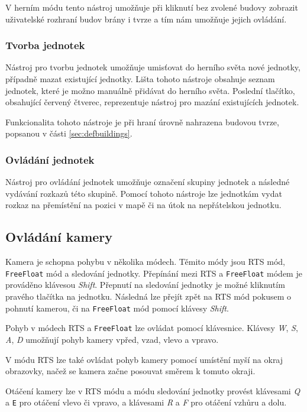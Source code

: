 V herním módu tento nástroj umožňuje při kliknutí bez zvolené budovy zobrazit uživatelské rozhraní budov brány i tvrze a tím nám umožňuje jejich ovládání.

\subsubsection{Tvorba jednotek}
Nástroj pro tvorbu jednotek umožňuje umisťovat do herního světa nové jednotky, případně mazat existující jednotky. Lišta tohoto nástroje obsahuje seznam jednotek, které je možno manuálně přidávat do herního světa. Poslední tlačítko, obsahující červený čtverec, reprezentuje nástroj pro mazání existujících jednotek.

Funkcionalita tohoto nástroje je při hraní úrovně nahrazena budovou tvrze, popsanou v části \ref{sec:defbuildings}.

\subsubsection{Ovládání jednotek}
Nástroj pro ovládání jednotek umožňuje označení skupiny jednotek a následné vydávání rozkazů této skupině. Pomocí tohoto nástroje lze jednotkám vydat rozkaz na přemístění na pozici v mapě či na útok na nepřátelskou jednotku.


\subsection{Ovládání kamery}
Kamera je schopna pohybu v několika módech. Těmito módy jsou RTS mód, \texttt{FreeFloat} mód a sledování jednotky. Přepínání mezi RTS a \texttt{FreeFloat} módem je prováděno klávesou \textit{Shift}. Přepnutí na sledování jednotky je možné kliknutím pravého tlačítka na jednotku. Následná lze přejít zpět na RTS mód pokusem o pohnutí kamerou, či na \texttt{FreeFloat} mód pomocí klávesy \textit{Shift}.

Pohyb v módech RTS a \texttt{FreeFloat} lze ovládat pomocí klávesnice. Klávesy \textit{W}, \textit{S}, \textit{A}, \textit{D} umožňují pohyb kamery vpřed, vzad, vlevo a vpravo. 

V módu RTS lze také ovládat pohyb kamery pomocí umístění myší na okraj obrazovky, načež se kamera začne posouvat směrem k tomuto okraji. 

Otáčení kamery lze v RTS módu a módu sledování jednotky provést klávesami \textit{Q} a \texttt{E} pro otáčení vlevo či vpravo, a klávesami \textit{R} a \textit{F} pro otáčení vzhůru a dolu. 


